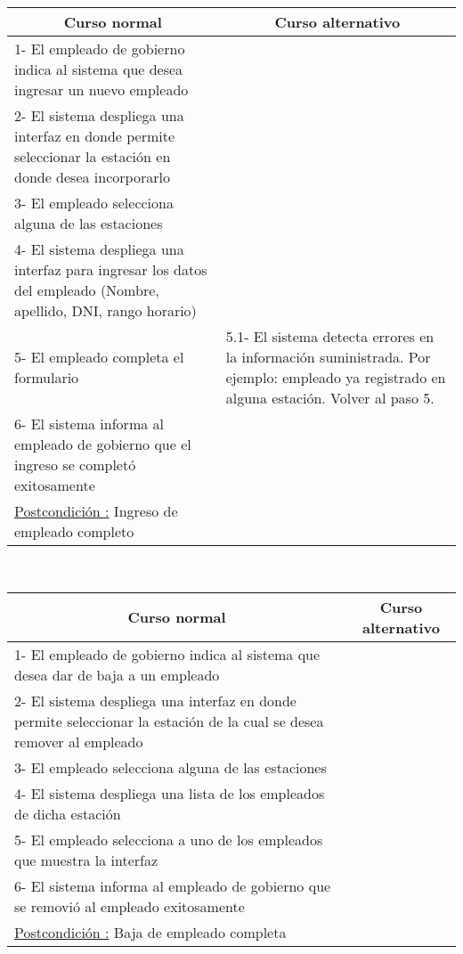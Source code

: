 \begin{center}
    \centering
    \begin{tabular}{ | p{11cm} | p{6cm} | }
        \multicolumn{1}{c}{\cellcolor{black!30}\textbf{Curso normal}} & 
        \multicolumn{1}{c}{\cellcolor{black!30}\textbf{Curso alternativo}} \\ \hline
        1- El empleado de gobierno indica al sistema que desea ingresar un nuevo empleado & \\ \hline
        2- El sistema despliega una interfaz en donde permite seleccionar la estación en donde desea incorporarlo & \\ \hline
        3- El empleado selecciona alguna de las estaciones & \\ \hline
        4- El sistema despliega una interfaz para ingresar los datos del empleado (Nombre, apellido, DNI, rango horario) & \\ \hline
        5- El empleado completa el formulario & 5.1- El sistema detecta errores en la información suministrada. Por ejemplo: empleado ya registrado en alguna estación. Volver al paso 5. \\ \hline
        6- El sistema informa al empleado de gobierno que el ingreso se completó exitosamente & \\ \hline
        \underline{Postcondición :} Ingreso de empleado completo & \\ \hline
    \end{tabular}
\end{center}

~


\begin{center}
    \centering
    \begin{tabular}{ | p{11cm} | p{6cm} | }
        \multicolumn{1}{c}{\cellcolor{black!30}\textbf{Curso normal}} & 
        \multicolumn{1}{c}{\cellcolor{black!30}\textbf{Curso alternativo}} \\ \hline
        1- El empleado de gobierno indica al sistema que desea dar de baja a un empleado & \\ \hline
        2- El sistema despliega una interfaz en donde permite seleccionar la estación de la cual se desea remover al empleado& \\ \hline
        3- El empleado selecciona alguna de las estaciones & \\ \hline
        4- El sistema despliega una lista de los empleados de dicha estación & \\ \hline
        5- El empleado selecciona a uno de los empleados que muestra la interfaz \\ \hline
        6- El sistema informa al empleado de gobierno que se removió al empleado exitosamente & \\ \hline
        \underline{Postcondición :} Baja de empleado completa & \\ \hline
    \end{tabular}
\end{center}


